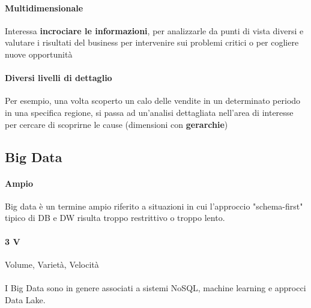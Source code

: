 \documentclass[10pt]{book}
\begin{document}
\paragraph{Multidimensionale} Interessa \textbf{incrociare le informazioni}, per analizzarle da punti di vista diversi e valutare i risultati del business per intervenire sui problemi critici o per cogliere nuove opportunità
\paragraph{Diversi livelli di dettaglio} Per esempio, una volta scoperto un calo delle vendite in un determinato periodo in una specifica regione, si passa ad un'analisi dettagliata nell'area di interesse per cercare di scoprirne le cause (dimensioni con \textbf{gerarchie})
\subsection{Big Data}
\paragraph{Ampio} Big data è un termine ampio riferito a situazioni in cui l'approccio "schema-first" tipico di DB e DW risulta troppo restrittivo o troppo lento.
\paragraph{3 V} Volume, Varietà, Velocità
\paragraph{} I Big Data sono in genere associati a sistemi NoSQL, machine learning e approcci Data Lake.
\end{document}
